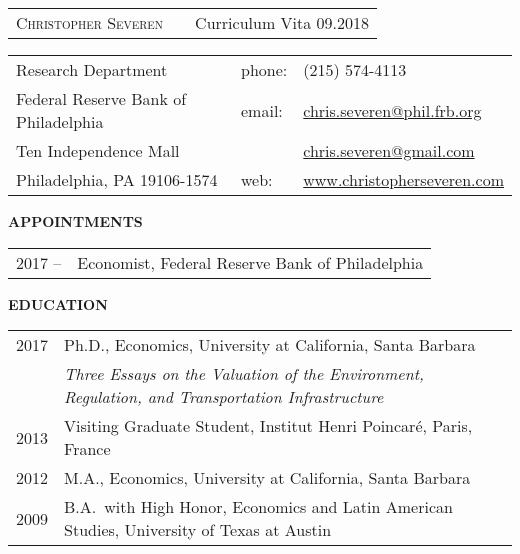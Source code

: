\documentclass[english, 10pt]{report}
\begin{document}
\begin{tabular}{@{}p{4.00in}R{0.5in}R{1.8in}}%
{\LARGE \textsc{Christopher Severen}} & & {\footnotesize Curriculum Vita 09.2018  }
\end{tabular}

\vspace{0.2in}

\begin{tabular}{@{}p{4.00in}R{0.5in}l}%
Research Department           			&phone: 	& (215) 574-4113 \\                    
Federal Reserve Bank of Philadelphia	&email: 	& \href{mailto:chris.severen@phil.frb.org}{chris.severen@phil.frb.org}  \\ 
Ten Independence Mall  				& 		&   \href{mailto:chris.severen@gmail.com}{chris.severen@gmail.com}\\
Philadelphia, PA 19106-1574			&web: 	& \href{http://www.christopherseveren.com}{www.christopherseveren.com} 
\end{tabular}

\vspace{0.2in}

{\bf {APPOINTMENTS}}

\begin{tabular}{@{}p{0.4in}p{6.1in}}
	2017 --	& Economist, Federal Reserve Bank of Philadelphia 
\end{tabular}

\vspace{0.2in}

{\bf {EDUCATION}}

\begin{tabular}{@{}p{0.4in}p{6.1in}}
	2017 	& Ph.D., Economics, University at California, Santa Barbara\\
			& \emph{Three Essays on the Valuation of the Environment, Regulation, and Transportation Infrastructure} \\
	2013  	& Visiting Graduate Student, Institut Henri Poincar\'{e}, Paris, France \\
	2012		& M.A., Economics, University at California, Santa Barbara\\
	2009		& B.A.\ with High Honor, Economics and Latin American Studies, University of Texas at Austin
\end{tabular}
\end{document}
